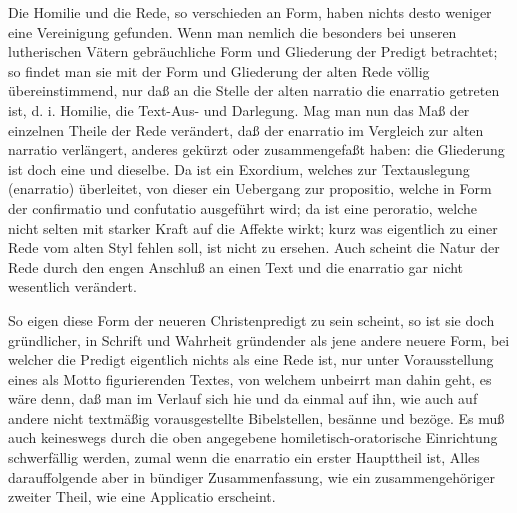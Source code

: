 Die Homilie und die Rede, so verschieden an Form, haben nichts desto weniger eine Vereinigung gefunden. Wenn man nemlich die besonders bei unseren lutherischen Vätern gebräuchliche Form und Gliederung der Predigt betrachtet; so findet man sie mit der Form und Gliederung der alten Rede völlig übereinstimmend, nur daß an die Stelle der alten narratio die enarratio getreten ist, d. i. Homilie, die Text-Aus- und Darlegung. Mag man nun das Maß der einzelnen Theile der Rede verändert, daß der enarratio im Vergleich zur alten narratio verlängert, anderes gekürzt oder zusammengefaßt haben: die Gliederung ist doch eine und dieselbe. Da ist ein Exordium, welches zur Textauslegung (enarratio) überleitet, von dieser ein Uebergang zur propositio, welche in Form der confirmatio und confutatio ausgeführt wird; da ist eine peroratio, welche nicht selten mit starker Kraft auf die Affekte wirkt; kurz was eigentlich zu einer Rede vom alten Styl fehlen soll, ist nicht zu ersehen. Auch scheint die Natur der Rede durch den engen Anschluß an einen Text und die enarratio gar nicht wesentlich verändert.

So eigen diese Form der neueren Christenpredigt zu sein scheint, so ist sie doch gründlicher, in Schrift und Wahrheit gründender als jene andere neuere Form, bei welcher die Predigt eigentlich nichts als eine Rede ist, nur unter Vorausstellung eines als Motto figurierenden Textes, von welchem unbeirrt man dahin geht, es wäre denn, daß man im Verlauf
sich hie und da einmal auf ihn, wie auch auf andere nicht textmäßig vorausgestellte Bibelstellen, besänne und bezöge. Es muß auch keineswegs durch die oben angegebene homiletisch-oratorische Einrichtung schwerfällig werden, zumal wenn die enarratio ein erster Haupttheil ist, Alles darauffolgende aber in bündiger Zusammenfassung, wie ein zusammengehöriger zweiter Theil, wie eine Applicatio erscheint.

